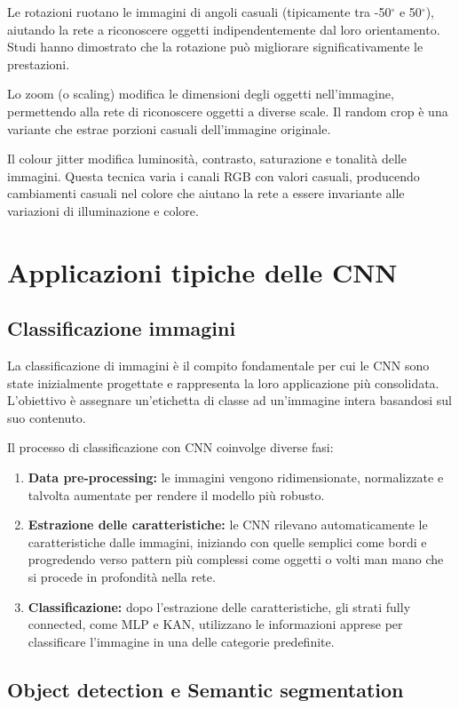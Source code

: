 \documentclass[a4paper,12pt]{report}
\begin{document}
	Le rotazioni ruotano le immagini di angoli casuali (tipicamente tra -50$^\circ$ e 50$^\circ$), aiutando la rete a riconoscere oggetti indipendentemente dal loro orientamento. Studi hanno dimostrato che la rotazione può migliorare significativamente le prestazioni.
	
	Lo zoom (o scaling) modifica le dimensioni degli oggetti nell'immagine, permettendo alla rete di riconoscere oggetti a diverse scale. Il random crop è una variante che estrae porzioni casuali dell'immagine originale.
	
	Il colour jitter modifica luminosità, contrasto, saturazione e tonalità delle immagini. Questa tecnica varia i canali RGB con valori casuali, producendo cambiamenti casuali nel colore che aiutano la rete a essere invariante alle variazioni di illuminazione e colore.
	
	\section{Applicazioni tipiche delle CNN}
	
	\subsection{Classificazione immagini}
	La classificazione di immagini è il compito fondamentale per cui le CNN sono state inizialmente progettate e rappresenta la loro applicazione più consolidata. L'obiettivo è assegnare un'etichetta di classe ad un'immagine intera basandosi sul suo contenuto.
	
	Il processo di classificazione con CNN coinvolge diverse fasi:
	\begin{enumerate}
		\item \textbf{Data pre-processing:} le immagini vengono ridimensionate, normalizzate e talvolta aumentate per rendere il modello più robusto.
		\item \textbf{Estrazione delle caratteristiche:} le CNN rilevano automaticamente le caratteristiche dalle immagini, iniziando con quelle semplici come bordi e progredendo verso pattern più complessi come oggetti o volti man mano che si procede in profondità nella rete.
		\item \textbf{Classificazione:} dopo l'estrazione delle caratteristiche, gli strati fully connected, come MLP e KAN, utilizzano le informazioni apprese per classificare l'immagine in una delle categorie predefinite.
	\end{enumerate}
	
	\subsection{Object detection e Semantic segmentation}
	
\end{document}
